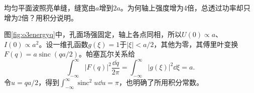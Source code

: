 \begin{exercise}\label{ex:o3energy}
均匀平面波照亮单缝，缝宽由$a$增到$2a$。为何轴上强度增为4倍，总透过功率却只增为2倍？用积分说明。
\end{exercise}
\begin{solution}
图\ref{fig:o3energyq}中，孔面场强固定，轴上各点同相，所以$U(0)\propto a$、$I(0)\propto a^2$。设一维孔函数$g(\xi)=1$于$|\xi|<a/2$，其他为零，其傅里叶变换$F(q)=a\operatorname{sinc}(qa/2)$。帕塞瓦尔关系给
\[
 \int_{-\infty}^{\infty}|F(q)|^2\frac{\dd q}{2\pi}
 =\int_{-\infty}^{\infty}|g(\xi)|^2\dd\xi=a.
\]
令$u=qa/2$，得到$\int_{-\infty}^{\infty}\operatorname{sinc}^2u\dd u=\pi$，也明确了所用积分常数。
\end{solution}

